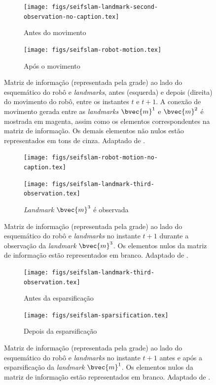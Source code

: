 \begin{figure}[h]
  \begin{subfigure}{0.475\textwidth}
    \texttt{[image: figs/seifslam-landmark-second-observation-no-caption.tex]}
    \caption{Antes do movimento}
  \end{subfigure}
  \hfill
  \begin{subfigure}{0.475\textwidth}
    \texttt{[image: figs/seifslam-robot-motion.tex]} 
    \caption{Após o movimento}
    \label{fig:seifslam-info-matrix-construction-motion-b}
  \end{subfigure}
  \caption{Matriz de informação (representada pela grade) ao lado do esquemático do robô e \textit{landmarks}, antes (esquerda) e depois (direita) do movimento do robô, entre os instantes $t$ e $t+1$. A conexão de movimento gerada entre as \textit{landmarks} $\bvec{m}^1$ e $\bvec{m}^2$ é mostrada em magenta, assim como os elementos correspondentes na matriz de informação. Os demais elementos não nulos estão representados em tons de cinza. Adaptado de \cite[p.~389]{bongard2006probabilistic}. }
  \label{fig:seifslam-info-matrix-construction-motion}
\end{figure}

\begin{figure}[h]
  \begin{subfigure}{0.475\textwidth}
    \texttt{[image: figs/seifslam-robot-motion-no-caption.tex]} 
    \caption{}
  \end{subfigure}
  \hfill
  \begin{subfigure}{0.475\textwidth}
    \texttt{[image: figs/seifslam-landmark-third-observation.tex]}
    \caption{\textit{Landmark} $\bvec{m}^3$ é observada}
    \label{fig:seifslam-info-matrix-construction-third-observation-b}
  \end{subfigure}
  \caption{Matriz de informação (representada pela grade) ao lado do esquemático do robô e \textit{landmarks} no instante $t+1$ durante a observação da \textit{landmark} $\bvec{m}^3$. Os elementos nulos da matriz de informação estão representados em branco. Adaptado de \cite[p.~389]{bongard2006probabilistic}.}
  \label{fig:seifslam-info-matrix-construction-third-observation}
\end{figure}

\begin{figure}[h]
  \begin{subfigure}{0.475\textwidth}
    \texttt{[image: figs/seifslam-landmark-third-observation.tex]}
    \caption{Antes da esparsificação}
  \end{subfigure}
  \hfill
  \begin{subfigure}{0.475\textwidth}
    \texttt{[image: figs/seifslam-sparsification.tex]} 
    \caption{Depois da esparsificação}
  \end{subfigure}
  \caption{Matriz de informação (representada pela grade) ao lado do esquemático do robô e \textit{landmarks} no instante $t+1$ antes e após a esparsificação da \textit{landmark} $\bvec{m}^1$. Os elementos nulos da matriz de informação estão representados em branco. Adaptado de \cite[p.~389]{bongard2006probabilistic}.}
  \label{fig:seifslam-info-matrix-sparsification}
\end{figure}

